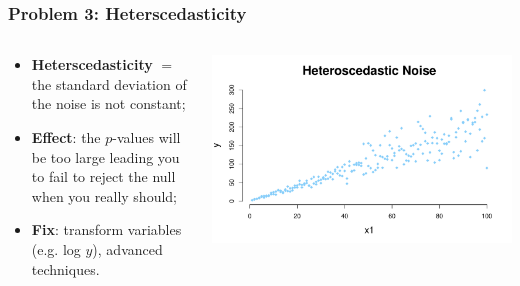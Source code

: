 \documentclass[aspectratio=169]{beamer}
\theoremstyle{principle}
\begin{document}
\begin{frame}
\frametitle{Problem 3: Heterscedasticity}

\begin{columns}
\begin{column}{0.5\textwidth}

\begin{itemize}
\item \textbf{Heterscedasticity} $=$ the standard deviation of the noise is not constant;
\bigskip
\bigskip

\item \textbf{Effect}: the $p$-values will be too large leading you to fail to reject the null when you really should;
\bigskip
\bigskip

\item \textbf{Fix}: transform variables (e.g. log $y$), advanced techniques.

\end{itemize}

\end{column}
\begin{column}{0.5\textwidth}
\begin{center}
\includegraphics[scale=0.35]{heteroscedasticity.pdf}
\end{center}
\end{column}
\end{columns}


\end{frame}
\end{document}
